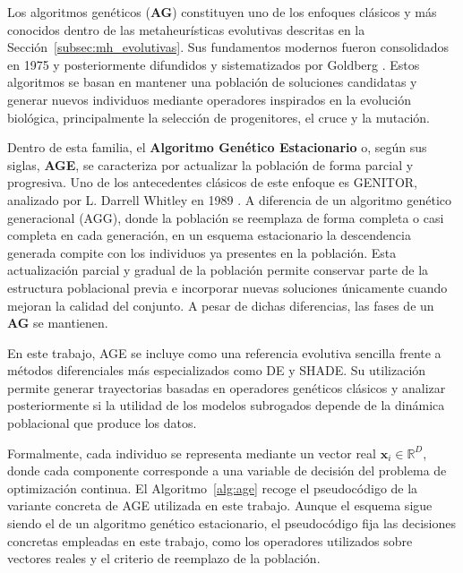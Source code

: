 Los algoritmos genéticos (\textbf{AG}) constituyen uno de los enfoques clásicos y más conocidos dentro de las metaheurísticas evolutivas descritas en la Sección~\ref{subsec:mh_evolutivas}. Sus fundamentos modernos fueron consolidados  en 1975 y posteriormente difundidos y sistematizados por Goldberg \cite{goldberg1989genetic}. Estos algoritmos se basan en mantener una población de soluciones candidatas y generar nuevos individuos mediante operadores inspirados en la evolución biológica, principalmente la selección de progenitores, el cruce y la mutación.

Dentro de esta familia, el \textbf{Algoritmo Genético Estacionario} o, según sus siglas, \textbf{AGE}, se caracteriza por actualizar la población de forma parcial y progresiva. Uno de los antecedentes clásicos de este enfoque es GENITOR, analizado por L. Darrell Whitley en 1989 \cite{whitley1989stationary}. A diferencia de un algoritmo genético generacional (AGG), donde la población se reemplaza de forma completa o casi completa en cada generación, en un esquema estacionario la descendencia generada compite con los individuos ya presentes en la población. Esta actualización parcial y gradual de la población permite conservar parte de la estructura poblacional previa e incorporar nuevas soluciones únicamente cuando mejoran la calidad del conjunto. A pesar de dichas diferencias, las fases de un \textbf{AG} se mantienen.

En este trabajo, AGE se incluye como una referencia evolutiva sencilla frente a métodos diferenciales más especializados como DE y SHADE. Su utilización permite generar trayectorias basadas en operadores genéticos clásicos y analizar posteriormente si la utilidad de los modelos subrogados depende de la dinámica poblacional que produce los datos.

Formalmente, cada individuo se representa mediante un vector real
\(\mathbf{x}_i \in \mathbb{R}^D\), donde cada componente corresponde a una
variable de decisión del problema de optimización continua. El
Algoritmo~\ref{alg:age} recoge el pseudocódigo de la variante concreta de AGE utilizada en este trabajo. Aunque el esquema sigue siendo el de un algoritmo genético estacionario, el pseudocódigo fija las decisiones concretas empleadas en este trabajo, como los operadores utilizados sobre vectores reales y el criterio de reemplazo de la población.



